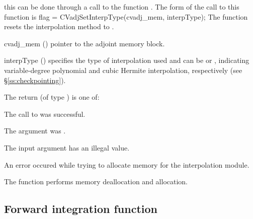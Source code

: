 this can be done through a call to the function .
The form of the call to this function is
{
  flag = CVadjSetInterpType(cvadj\_mem, interpType);
}
{
  The function  resets the interpolation method to .
}
{
  \begin{args}[interpType]
  \item[cvadj\_mem] ()
    pointer to the adjoint memory block.
  \item[interpType] ()
    specifies the type of interpolation used and can be 
    or , indicating variable-degree polynomial and cubic Hermite
    interpolation, respectively (see \S\ref{ss:checkpointing}).
  \end{args}
}
{
  The return  (of type ) is one of:
  \begin{args}
  \item[\Id{CV\_SUCCESS}]
    The call to  was successful.
  \item[\Id{CV\_ADJMEM\_NULL}]
    The  argument was .
  \item[\Id{CV\_ILL\_INPUT}] 
    The input argument  has an illegal value.
  \item[\Id{CV\_MEM\_FAIL}]
    An error occured while trying to allocate memory for the interpolation module.
  \end{args}
}
{
  The function  performs memory deallocation and allocation.
}


\subsection{Forward integration function}
\label{sss:cvodef}

